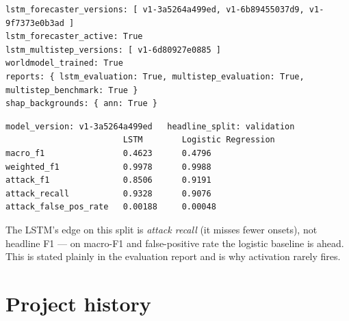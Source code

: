 \documentclass[11pt,a4paper]{article}
\begin{document}
\begin{lstlisting}[caption={\texttt{nids pipeline show} on the live repository}]
lstm_forecaster_versions: [ v1-3a5264a499ed, v1-6b89455037d9, v1-9f7373e0b3ad ]
lstm_forecaster_active: True
lstm_multistep_versions: [ v1-6d80927e0885 ]
worldmodel_trained: True
reports: { lstm_evaluation: True, multistep_evaluation: True, multistep_benchmark: True }
shap_backgrounds: { ann: True }
\end{lstlisting}

\begin{lstlisting}[caption={\texttt{nids benchmark} --- one-step LSTM vs logistic regression, validation split}]
model_version: v1-3a5264a499ed   headline_split: validation
                        LSTM        Logistic Regression
macro_f1                0.4623      0.4796
weighted_f1             0.9978      0.9988
attack_f1               0.8506      0.9191
attack_recall           0.9328      0.9076
attack_false_pos_rate   0.00188     0.00048
\end{lstlisting}

The LSTM's edge on this split is \emph{attack recall} (it misses fewer onsets),
not headline F1 --- on macro-F1 and false-positive rate the logistic baseline is
ahead. This is stated plainly in the evaluation report and is why activation
rarely fires.

\section{Project history}
\end{document}
